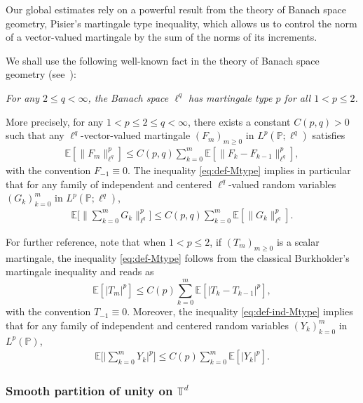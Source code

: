 \documentclass[12pt]{amsart}
\theoremstyle{definition}
\theoremstyle{remark}
\newcommand{\E}{\mathbb{E}}
\newcommand{\T}{\mathbb{T}}
\newcommand{\PP}{\mathbb{P}}
\numberwithin{equation}{section}
\begin{document}
Our global estimates rely on a powerful result from the theory of Banach space geometry, Pisier's martingale type inequality, which allows us to control the norm of a vector-valued martingale by the sum of the norms of its increments.

We shall use the following well-known fact in the theory of Banach space geometry (see~\cite[Proposition~10.36 and Definition~10.41]{Pis16}): 
\begin{center}
	{\it  For any  $2\le q<\infty$, the Banach space $\ell^q$ has martingale type $p$ for all $1<p\le 2$. }
\end{center}
More precisely,  for any  $1<p\le 2\le q<\infty$, there exists a constant $C(p, q)>0$ such that any $\ell^q$-vector-valued martingale $(F_m)_{m\ge 0}$ in $L^p(\PP; \ell^q)$ satisfies
\begin{align}\label{eq:def-Mtype}
	\E [\| F_m\|_{\ell^q}^p] \le C(p,q) \sum_{k=0}^m \E[\|F_k- F_{k-1}\|_{\ell^q}^p],
\end{align}
with the convention $F_{-1}\equiv 0$. 	The inequality \eqref{eq:def-Mtype} implies in particular that for any family of independent and  centered  $\ell^q$-valued random variables $(G_k)_{k=0}^m$  in $L^p(\PP; \ell^q)$, 
\begin{align}\label{eq:def-ind-Mtype}
	\E\Big[\Big\|\sum_{k=0}^m G_k\Big\|_{\ell^q}^p\Big] \le C(p,q)\sum_{k =0}^m \E[\|G_k \|_{\ell^q}^p].  
\end{align} 

For further reference, note that when $1<p\le 2$, if $(T_m)_{m\ge 0}$ is a scalar martingale, the inequality \eqref{eq:def-Mtype} follows from the classical Burkholder's martingale inequality and reads as 
\[
\E[|T_m|^p]\le C(p)\sum_{k=0}^m\E[|T_k-T_{k-1}|^p],
\]
with the convention $T_{-1}\equiv 0$.  Moreover,  the inequality \eqref{eq:def-ind-Mtype} implies that for any family of independent and  centered random variables $(Y_k)_{k=0}^m$  in $L^p(\PP)$, 
\begin{align}\label{eq:def-ind-Mtype-scalar}
	\E\Big[\Big|\sum_{k=0}^m Y_k \Big|^p\Big]\le C(p)\sum_{k=0}^m \E[|Y_k|^p].  
\end{align} 

\subsubsection{Smooth partition of unity on $\T^d$}\label{sssec:pou}
\end{document}
